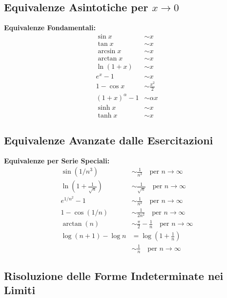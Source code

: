 \subsection{Equivalenze Asintotiche per $x \to 0$}

\begin{info}
\textbf{Equivalenze Fondamentali:}
\begin{align}
\sin x &\sim x \\
\tan x &\sim x \\
\arcsin x &\sim x \\
\arctan x &\sim x \\
\ln(1+x) &\sim x \\
e^x - 1 &\sim x \\
1 - \cos x &\sim \frac{x^2}{2} \\
(1+x)^\alpha - 1 &\sim \alpha x \\
\sinh x &\sim x \\
\tanh x &\sim x
\end{align}
\end{info}

\subsection{Equivalenze Avanzate dalle Esercitazioni}

\begin{info}
\textbf{Equivalenze per Serie Speciali:}
\begin{align}
\sin(1/n^3) &\sim \frac{1}{n^3} \quad \text{per } n \to \infty \\
\ln\left(1 + \frac{1}{\sqrt{n}}\right) &\sim \frac{1}{\sqrt{n}} \quad \text{per } n \to \infty \\
e^{1/n^2} - 1 &\sim \frac{1}{n^2} \quad \text{per } n \to \infty \\
1 - \cos(1/n) &\sim \frac{1}{2n^2} \quad \text{per } n \to \infty \\
\arctan(n) &\sim \frac{\pi}{2} - \frac{1}{n} \quad \text{per } n \to \infty \\
\log(n+1) - \log n &= \log\left(1 + \frac{1}{n}\right) \\
&\sim \frac{1}{n} \quad \text{per } n \to \infty
\end{align}
\end{info}

\subsection{Risoluzione delle Forme Indeterminate nei Limiti}

